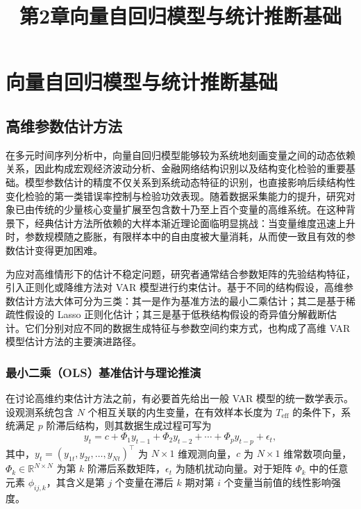 \documentclass[UTF8,a4paper,12pt]{ctexbook}
\title{第2章\quad 向量自回归模型与统计推断基础}
\author{}
\date{}
\begin{document}
\maketitle

\setcounter{chapter}{1}
\chapter{向量自回归模型与统计推断基础}
\setcounter{section}{1}

\section{高维参数估计方法}

在多元时间序列分析中，向量自回归模型能够较为系统地刻画变量之间的动态依赖关系，因此构成宏观经济波动分析、金融网络结构识别以及结构变化检验的重要基础。模型参数估计的精度不仅关系到系统动态特征的识别，也直接影响后续结构性变化检验的第一类错误率控制与检验功效表现。随着数据采集能力的提升，研究对象已由传统的少量核心变量扩展至包含数十乃至上百个变量的高维系统。在这种背景下，经典估计方法所依赖的大样本渐近理论面临明显挑战：当变量维度迅速上升时，参数规模随之膨胀，有限样本中的自由度被大量消耗，从而使一致且有效的参数估计变得更加困难。

为应对高维情形下的估计不稳定问题，研究者通常结合参数矩阵的先验结构特征，引入正则化或降维方法对 VAR 模型进行约束估计。基于不同的结构假设，高维参数估计方法大体可分为三类：其一是作为基准方法的最小二乘估计；其二是基于稀疏性假设的 Lasso 正则化估计；其三是基于低秩结构假设的奇异值分解截断估计。它们分别对应不同的数据生成特征与参数空间约束方式，也构成了高维 VAR 模型估计方法的主要演进路径。

\subsection{最小二乘（OLS）基准估计与理论推演}

在讨论高维约束估计方法之前，有必要首先给出一般 VAR 模型的统一数学表示。设观测系统包含 $N$ 个相互关联的内生变量，在有效样本长度为 $T_{\mathrm{eff}}$ 的条件下，系统满足 $p$ 阶滞后结构，则其数据生成过程可写为
\begin{equation}
 y_t = c + \Phi_1 y_{t-1} + \Phi_2 y_{t-2} + \cdots + \Phi_p y_{t-p} + \epsilon_t,
\end{equation}
其中，$y_t=(y_{1t},y_{2t},\dots,y_{Nt})^{\top}$ 为 $N\times 1$ 维观测向量，$c$ 为 $N\times 1$ 维常数项向量，$\Phi_k\in\mathbb{R}^{N\times N}$ 为第 $k$ 阶滞后系数矩阵，$\epsilon_t$ 为随机扰动向量。对于矩阵 $\Phi_k$ 中的任意元素 $\phi_{ij,k}$，其含义是第 $j$ 个变量在滞后 $k$ 期对第 $i$ 个变量当前值的线性影响强度。
\end{document}

